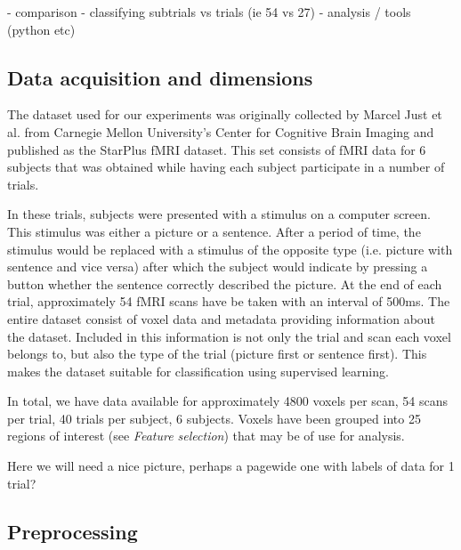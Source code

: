 \documentclass[preprint,journal,11pt]{vgtc}
\begin{document}
- comparison
- classifying subtrials vs trials (ie 54 vs 27)
- analysis / tools (python etc)

\subsection{Data acquisition and dimensions}
The dataset used for our experiments was originally collected by Marcel Just et al. from Carnegie Mellon University's Center for Cognitive Brain Imaging and published as the StarPlus fMRI dataset. This set consists of fMRI data for 6 subjects that was obtained while having each subject participate in a number of trials.

In these trials, subjects were presented with a stimulus on a computer screen. This stimulus was either a picture or a sentence. After a period of time, the stimulus would be replaced with a stimulus of the opposite type (i.e. picture with sentence and vice versa) after which the subject would indicate by pressing a button whether the sentence correctly described the picture. At the end of each trial, approximately 54 fMRI scans have be taken with an interval of 500ms.
The entire dataset consist of voxel data and metadata providing information about the dataset. Included in this information is not only the trial and scan each voxel belongs to, but also the type of the trial (picture first or sentence first). This makes the dataset suitable for classification using supervised learning.

In total, we have data available for approximately 4800 voxels per scan, 54 scans per trial, 40 trials per subject, 6 subjects. Voxels have been grouped into 25 regions of interest (see \textit{Feature selection}) that may be of use for analysis.

Here we will need a nice picture, perhaps a pagewide one with labels of data for 1 trial?

\subsection{Preprocessing}
\end{document}
